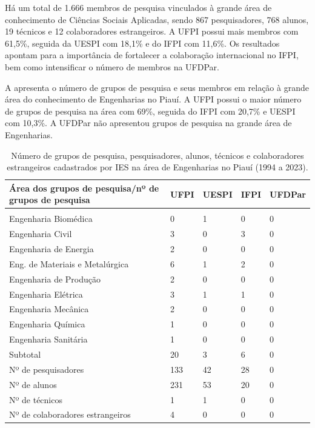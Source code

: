 \documentclass[portuguese]{textolivre}
\begin{document}
Há um total de 1.666 membros de pesquisa vinculados à grande área de conhecimento de Ciências Sociais Aplicadas, sendo 867 pesquisadores, 768 alunos, 19 técnicos e 12 colaboradores estrangeiros. A UFPI possui mais membros com 61,5\%, seguida da UESPI com 18,1\% e do IFPI com 11,6\%. Os resultados apontam para a importância de fortalecer a colaboração internacional no IFPI, bem como intensificar o número de membros na UFDPar.

A  apresenta o número de grupos de pesquisa e seus membros em relação à grande área do conhecimento de Engenharias no Piauí. A UFPI possui o maior número de grupos de pesquisa na área com 69\%, seguida do IFPI com 20,7\% e UESPI com 10,3\%. A UFDPar não apresentou grupos de pesquisa na grande área de Engenharias.

\begin{table}[htbp]
\centering
\begin{threeparttable}
\caption{Número de grupos de pesquisa, pesquisadores, alunos, técnicos e colaboradores estrangeiros cadastrados por IES na área de Engenharias no Piauí (1994 a 2023).}
\label{tbl10}
\begin{tabular}{>{\raggedright\arraybackslash}p{5cm} l l l l}
\toprule
Área dos grupos de pesquisa/nº de grupos de pesquisa & UFPI & UESPI & IFPI & UFDPar \\ 
\midrule
\multicolumn{5}{c}{Engenharias} \\
\midrule
Engenharia Biomédica & 0 & 1 & 0 & 0 \\
Engenharia Civil & 3 & 0 & 3 & 0 \\
Engenharia de Energia & 2 & 0 & 0 & 0 \\
Eng. de Materiais e Metalúrgica & 6 & 1 & 2 & 0 \\
Engenharia de Produção & 2 & 0 & 0 & 0 \\
Engenharia Elétrica & 3 & 1 & 1 & 0 \\
Engenharia Mecânica & 2 & 0 & 0 & 0 \\
Engenharia Química & 1 & 0 & 0 & 0 \\
Engenharia Sanitária & 1 & 0 & 0 & 0 \\
\midrule
Subtotal & 20 & 3 & 6 & 0 \\
\midrule
Nº de pesquisadores & 133 & 42 & 28 & 0 \\
Nº de alunos & 231 & 53 & 20 & 0 \\
Nº de técnicos & 1 & 1 & 0 & 0 \\
Nº de colaboradores estrangeiros & 4 & 0 & 0 & 0 \\
\bottomrule
\end{tabular}
\end{threeparttable}
\end{table}
\end{document}
